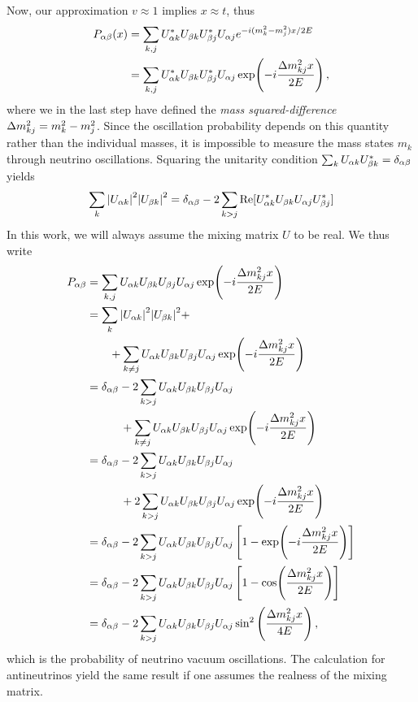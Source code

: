 \documentclass[draft=True]{revtex4-2}
\begin{document}
Now, our approximation $v\approx 1$ implies $x\approx t $, thus
\begin{align}
    P_{\ab}(x) &= \sum_{k,j} U^*_{\a k}U_{\b k}U^*_{\b j}U_{\a j} e^{-i(m_k^2-m_j^2)x/2E} \nonumber \\
                       &= \sum_{k,j} U^*_{\a k}U_{\b k}U^*_{\b j}U_{\a j} \exp(-i\frac{\dm_{kj}x}{2E})\,,
\end{align}
where we in the last step have defined the \emph{mass squared-difference} $\dm_{kj} = m_k^2 - m_j^2$. Since the oscillation probability depends on this quantity
rather than the individual masses, it is impossible
to measure the mass states $m_k$ through neutrino oscillations.
Squaring the unitarity condition $\sum_k U_{\alpha k}U_{\beta k}^* = \delta_{\alpha \beta}$ yields 
\begin{align}
    \sum_k \abs{U_{\alpha k}}^2\abs{U_{\beta k}}^2 = \delta_{\alpha \beta} - 2 \sum_{k>j}\Re[U_{\alpha k}^* U_{\beta k} U_{\alpha j} U_{\beta j}^*]
\end{align}
In this work, we will always assume the mixing matrix $U$ to be real. 
We thus write 
\begin{align}\label{eq:Pab}
    P_{\ab} &= \sum_{k,j} U_{\a k}U_{\b k}U_{\b j}U_{\a j} \exp(-i\frac{\dm_{kj}x}{2E}) \nonumber \\
            &=  \sum_k \abs{U_{\a k}}^2\abs{U_{\b k}}^2 + \nonumber \\
            &\hspace{2em}+ \sum_{k \neq j} U_{\a k}U_{\b k}U_{\b j}U_{\a j} \exp(-i\frac{\dm_{kj}x}{2E}) \nonumber \\
            &= \delta_{\a \b} - 2 \sum_{k>j}U_{\a k} U_{\b k} U_{\b j} U_{\a j} \nonumber \\
            & \hspace{3em}+\sum_{k \neq j} U_{\a k}U_{\b k}U_{\b j}U_{\a j} \exp(-i\frac{\dm_{kj}x}{2E}) \nonumber \\
            &= \delta_{\a \b} - 2 \sum_{k>j}U_{\a k} U_{\b k} U_{\b j} U_{\a j} \nonumber \\
            &\hspace{3em}+ 2\sum_{k > j} U_{\a k}U_{\b k}U_{\b j}U_{\a j} \exp(-i\frac{\dm_{kj}x}{2E}) \nonumber \\
            &= \delta_{\a \b} - 2\sum_{k > j} U_{\a k}U_{\b k}U_{\b j}U_{\a j} \left[1-\exp(-i\frac{\dm_{kj}x}{2E})\right] \nonumber \\
            &= \delta_{\a \b} - 2\sum_{k > j} U_{\a k}U_{\b k}U_{\b j}U_{\a j} \left[1-\cos(\frac{\dm_{kj}x}{2E})\right] \nonumber \\
            &= \delta_{\a \b} - 2\sum_{k > j} U_{\a k}U_{\b k}U_{\b j}U_{\a j} \sin^2{\left(\frac{\dm_{kj}x}{4E}\right)}\,,
\end{align}
which is the probability of neutrino vacuum oscillations. %
The calculation for antineutrinos yield the same result if one assumes the realness of the mixing matrix. 
\end{document}
